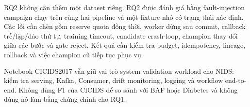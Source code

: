 RQ2 không cần thêm một dataset riêng. RQ2 được đánh giá bằng fault-injection campaign chạy trên cùng hai pipeline và một fixture nhỏ có trạng thái xác định. Các lỗi cần chèn gồm reserve quota đồng thời, worker dừng sau commit, callback trễ/lặp/đảo thứ tự, training timeout, candidate crash-loop, champion thay đổi giữa các bước và gate reject. Kết quả cần kiểm tra budget, idempotency, lineage, rollback và việc champion cũ tiếp tục phục vụ.

Notebook CICIDS2017 vẫn giữ vai trò system validation workload cho NIDS: kiểm tra serving, Kafka, Consumer, drift monitoring, logging và workflow end-to-end. Không dùng F1 của CICIDS để so sánh với BAF hoặc Diabetes và không dùng nó làm bằng chứng chính cho RQ1.
